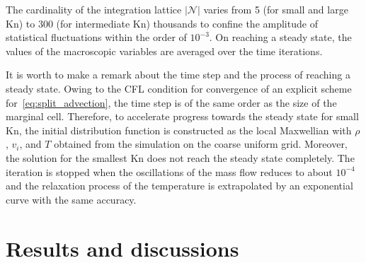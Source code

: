 \documentclass[aip,pof,preprint]{revtex4-1}
\newcommand{\Kn}{\mathrm{Kn}}
\newcommand{\Nu}{\mathcal{N}}
\begin{document}
The cardinality of the integration lattice \(|\Nu|\) varies from 5 (for small and large \(\Kn\))
to 300 (for intermediate \(\Kn\)) thousands to confine the amplitude of statistical fluctuations
within the order of \(10^{-3}\). On reaching a steady state,
the values of the macroscopic variables are averaged over the time iterations.

It is worth to make a remark about the time step and the process of reaching a steady state.
Owing to the CFL condition for convergence of an explicit scheme for~\eqref{eq:split_advection},
the time step is of the same order as the size of the marginal cell.
Therefore, to accelerate progress towards the steady state for small \(\Kn\),
the initial distribution function is constructed as the local Maxwellian
with \(\rho\), \(v_i\), and \(T\) obtained from the simulation on the coarse uniform grid.
Moreover, the solution for the smallest \(\Kn\) does not reach the steady state completely.
The iteration is stopped when the oscillations of the mass flow reduces to about \(10^{-4}\)
and the relaxation process of the temperature is extrapolated by an exponential curve with the same accuracy.

\section{Results and discussions}
\end{document}
